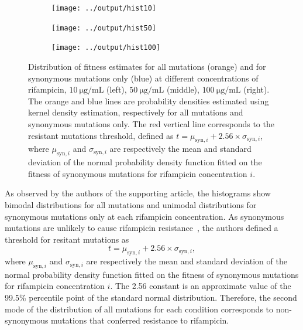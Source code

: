 \documentclass[12pt]{article}
\begin{document}
  \begin{figure}[ht]
    \begin{subfigure}{.33\textwidth}
      \centering
      \texttt{[image: ../output/hist10]}
    \end{subfigure}
    \begin{subfigure}{.33\textwidth}
      \centering
      \texttt{[image: ../output/hist50]}
    \end{subfigure}
    \begin{subfigure}{.33\textwidth}
      \centering
      \texttt{[image: ../output/hist100]}
    \end{subfigure}
    \caption{Distribution of fitness estimates for all mutations (orange) and
    for synonymous mutations only (blue) at different concentrations of
    rifampicin, $\SI{10}{\micro\gram\per\milli\liter}$ (left),
    $\SI{50}{\micro\gram\per\milli\liter}$ (middle),
    $\SI{100}{\micro\gram\per\milli\liter}$ (right). The orange and blue lines
    are probability densities estimated using kernel density estimation,
    respectively for all mutations and synonymous mutations only. The red
    vertical line corresponds to the resistant mutations threshold, defined as
    $t = \mu_{\text{syn}, i} + 2.56 \times \sigma_{\text{syn}, i}$, where
    $\mu_{\text{syn}, i}$ and $\sigma_{\text{syn}, i}$ are respectively the
    mean and standard deviation of the normal probability density function
    fitted on the fitness of synonymous mutations for rifampicin concentration
    $i$.}%
    \label{fig:fitnessdistrib}
  \end{figure}

  As observed by the authors of the supporting article, the histograms show
  bimodal distributions for all mutations and unimodal distributions for
  synonymous mutations only at each rifampicin concentration. As synonymous
  mutations are unlikely to cause rifampicin resistance~\cite{choudhury2020},
  the authors defined a threshold for resitant mutations as
  \begin{equation}\label{eq:resistthreshold}
    t = \mu_{\text{syn}, i} + 2.56 \times \sigma_{\text{syn}, i},
  \end{equation}
  where $\mu_{\text{syn}, i}$ and $\sigma_{\text{syn}, i}$ are respectively the
  mean and standard deviation of the normal probability density function fitted
  on the fitness of synonymous mutations for rifampicin concentration $i$. The
  2.56 constant is an approximate value of the 99.5\% percentile point of the
  standard normal distribution. Therefore, the second mode of the distribution
  of all mutations for each condition corresponds to non-synonymous mutations
  that conferred resistance to rifampicin. 
\end{document}

